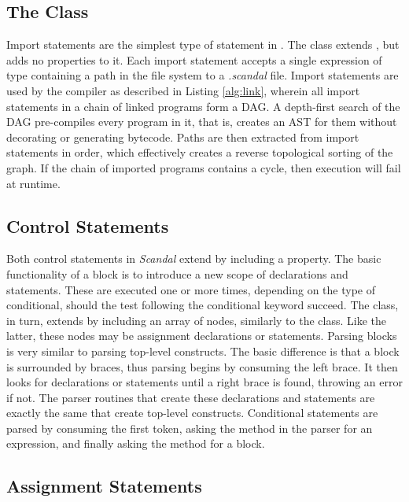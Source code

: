 \subsection{The  Class}

Import statements are the simplest type of statement in . The  class extends , but adds no properties to it. Each import statement accepts a single expression of type  containing a path in the file system to a \emph{.scandal} file. Import statements are used by the compiler as described in Listing \ref{alg:link}, wherein all import statements in a chain of linked programs form a DAG. A depth-first search of the DAG pre-compiles every program in it, that is, creates an AST for them without decorating or generating bytecode. Paths are then extracted from import statements in order, which effectively creates a reverse topological sorting of the graph. If the chain of imported programs contains a cycle, then execution will fail at runtime.

\subsection{Control Statements}

Both control statements in \emph{Scandal} extend  by including a  property. The basic functionality of a block is to introduce a new scope of declarations and statements. These are executed one or more times, depending on the type of conditional, should the test following the conditional keyword succeed. The  class, in turn, extends  by including an array of nodes, similarly to the  class. Like the latter, these nodes may be assignment declarations or statements. Parsing blocks is very similar to parsing top-level constructs. The basic difference is that a block is surrounded by braces, thus parsing begins by consuming the left brace. It then looks for declarations or statements until a right brace is found, throwing an error if not. The parser routines that create these declarations and statements are exactly the same that create top-level constructs. Conditional statements are parsed by consuming the first token, asking the  method in the parser for an expression, and finally asking the  method for a block.

\subsection{Assignment Statements}


